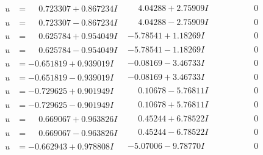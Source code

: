 \documentclass[1p]{elsarticle_modified}
\theoremstyle{definition}
\begin{document}
$$\begin{array}{c|c|c}
\begin{aligned}
u &= \phantom{-}0.723307 + 0.867234 I\end{aligned}
 & \phantom{-}4.04288 + 2.75909 I & \phantom{-0.000000 } 0 \\ \hline\begin{aligned}
u &= \phantom{-}0.723307 - 0.867234 I\end{aligned}
 & \phantom{-}4.04288 - 2.75909 I & \phantom{-0.000000 } 0 \\ \hline\begin{aligned}
u &= \phantom{-}0.625784 + 0.954049 I\end{aligned}
 & -5.78541 + 1.18269 I & \phantom{-0.000000 } 0 \\ \hline\begin{aligned}
u &= \phantom{-}0.625784 - 0.954049 I\end{aligned}
 & -5.78541 - 1.18269 I & \phantom{-0.000000 } 0 \\ \hline\begin{aligned}
u &= -0.651819 + 0.939019 I\end{aligned}
 & -0.08169 - 3.46733 I & \phantom{-0.000000 } 0 \\ \hline\begin{aligned}
u &= -0.651819 - 0.939019 I\end{aligned}
 & -0.08169 + 3.46733 I & \phantom{-0.000000 } 0 \\ \hline\begin{aligned}
u &= -0.729625 + 0.901949 I\end{aligned}
 & \phantom{-}0.10678 - 5.76811 I & \phantom{-0.000000 } 0 \\ \hline\begin{aligned}
u &= -0.729625 - 0.901949 I\end{aligned}
 & \phantom{-}0.10678 + 5.76811 I & \phantom{-0.000000 } 0 \\ \hline\begin{aligned}
u &= \phantom{-}0.669067 + 0.963826 I\end{aligned}
 & \phantom{-}0.45244 + 6.78522 I & \phantom{-0.000000 } 0 \\ \hline\begin{aligned}
u &= \phantom{-}0.669067 - 0.963826 I\end{aligned}
 & \phantom{-}0.45244 - 6.78522 I & \phantom{-0.000000 } 0 \\ \hline\begin{aligned}
u &= -0.662943 + 0.978808 I\end{aligned}
 & -5.07006 - 9.78770 I & \phantom{-0.000000 } 0 \\ \hline\begin{aligned}

\end{aligned}
\end{array}$$
\end{document}
